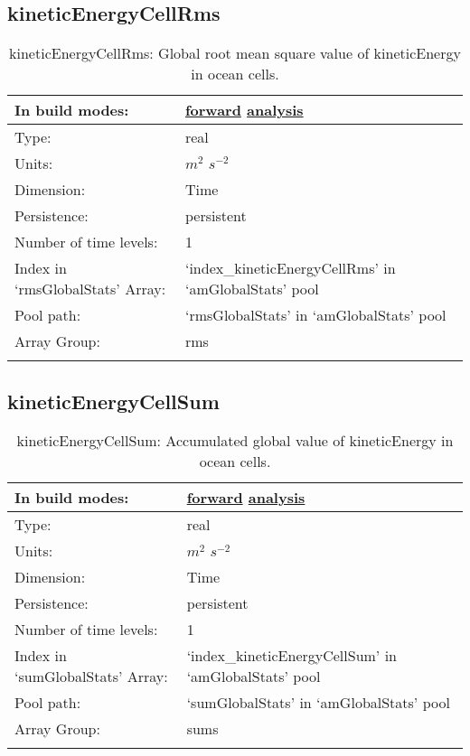 \subsection[kineticEnergyCellRms]{kineticEnergyCellRms}
\label{subsec:var_sec_amGlobalStats_kineticEnergyCellRms}
\begin{center}
\begin{longtable}{| p{2.0in} | p{4.0in} |}
        \hline 
        In build modes: & \hyperref[subsec:forward_var_tab_amGlobalStats]{forward} \hyperref[subsec:analysis_var_tab_amGlobalStats]{analysis} \\
        \hline 
        Type: & real \\
        \hline 
        Units: & $m^2$ $s^{-2}$ \\
        \hline 
        Dimension: & Time \\
        \hline 
        Persistence: & persistent \\
        \hline 
        Number of time levels: & 1 \\
        \hline 
		 Index in `rmsGlobalStats' Array: & `index\_kineticEnergyCellRms' in `amGlobalStats' pool \\
		 \hline 
            Pool path: & `rmsGlobalStats' in `amGlobalStats' pool \\
		 \hline 
		 Array Group: & rms \\
		 \hline 
    \caption{kineticEnergyCellRms: Global root mean square value of kineticEnergy in ocean cells.}
\end{longtable}
\end{center}
\subsection[kineticEnergyCellSum]{kineticEnergyCellSum}
\label{subsec:var_sec_amGlobalStats_kineticEnergyCellSum}
\begin{center}
\begin{longtable}{| p{2.0in} | p{4.0in} |}
        \hline 
        In build modes: & \hyperref[subsec:forward_var_tab_amGlobalStats]{forward} \hyperref[subsec:analysis_var_tab_amGlobalStats]{analysis} \\
        \hline 
        Type: & real \\
        \hline 
        Units: & $m^2$ $s^{-2}$ \\
        \hline 
        Dimension: & Time \\
        \hline 
        Persistence: & persistent \\
        \hline 
        Number of time levels: & 1 \\
        \hline 
		 Index in `sumGlobalStats' Array: & `index\_kineticEnergyCellSum' in `amGlobalStats' pool \\
		 \hline 
            Pool path: & `sumGlobalStats' in `amGlobalStats' pool \\
		 \hline 
		 Array Group: & sums \\
		 \hline 
    \caption{kineticEnergyCellSum: Accumulated global value of kineticEnergy in ocean cells.}
\end{longtable}
\end{center}
